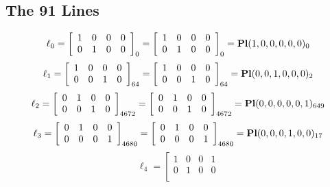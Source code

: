\documentclass{article}
\begin{document}
{\subsection*{The 91 Lines}
$$
\ell_{0} = 
\left[
\begin{array}{*{4}{r}}
1 & 0 & 0 & 0\\
0 & 1 & 0 & 0\\
\end{array}
\right]
_{0}
=
\left[
\begin{array}{*{4}c}
1  & 0  & 0  & 0\\
0  & 1  & 0  & 0\\
\end{array}
\right]_{0}
={\rm\bf Pl}(1,0,0,0,0,0 )_{0}$$
$$
\ell_{1} = 
\left[
\begin{array}{*{4}{r}}
1 & 0 & 0 & 0\\
0 & 0 & 1 & 0\\
\end{array}
\right]
_{64}
=
\left[
\begin{array}{*{4}c}
1  & 0  & 0  & 0\\
0  & 0  & 1  & 0\\
\end{array}
\right]_{64}
={\rm\bf Pl}(0,0,1,0,0,0 )_{2}$$
$$
\ell_{2} = 
\left[
\begin{array}{*{4}{r}}
0 & 1 & 0 & 0\\
0 & 0 & 1 & 0\\
\end{array}
\right]
_{4672}
=
\left[
\begin{array}{*{4}c}
0  & 1  & 0  & 0\\
0  & 0  & 1  & 0\\
\end{array}
\right]_{4672}
={\rm\bf Pl}(0,0,0,0,0,1 )_{649}$$
$$
\ell_{3} = 
\left[
\begin{array}{*{4}{r}}
0 & 1 & 0 & 0\\
0 & 0 & 0 & 1\\
\end{array}
\right]
_{4680}
=
\left[
\begin{array}{*{4}c}
0  & 1  & 0  & 0\\
0  & 0  & 0  & 1\\
\end{array}
\right]_{4680}
={\rm\bf Pl}(0,0,0,1,0,0 )_{17}$$
$$
\ell_{4} = 
\left[
\begin{array}{*{4}{r}}
1 & 0 & 0 & 1\\
0 & 1 & 0 & 0\\
\end{array}
$$}
\end{document}
